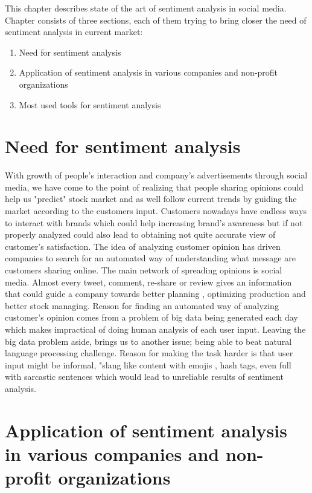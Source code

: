 This chapter describes state of the art of sentiment analysis in social media.
Chapter consists of three sections, each of them trying to bring closer the need of sentiment analysis in current market:

\begin{enumerate}
	\item Need for sentiment analysis
	\item Application of sentiment analysis in various companies and non-profit organizations
	\item Most used tools for sentiment analysis
\end{enumerate}

\section{Need for sentiment analysis}
With growth of people's interaction and company's advertisements through social media, we have come to the point of realizing that people sharing opinions could help us "predict" stock market and as well follow current trends by guiding the market according to the customers input.
Customers nowadays have endless ways to interact with brands which could help increasing brand's awareness but if not properly analyzed could also lead to obtaining not quite accurate view of customer's satisfaction.
The idea of analyzing customer opinion has driven companies to search for an automated way of understanding what message are customers sharing online. The main network of spreading opinions is social media. Almost every tweet, comment, re-share or  review gives an information that could guide a company towards better planning , optimizing production and better stock managing.
Reason for finding an automated way of analyzing customer's opinion comes from a problem of big data being generated each day which makes impractical of doing human analysis of each user input. Leaving the big data problem aside, brings us to another issue; being able to beat natural language processing challenge. Reason for making the task harder is that user input might be informal, "slang like content with emojis , hash tags, even full with sarcastic sentences which would lead to unreliable results of sentiment analysis.

\section{Application of sentiment analysis in various companies and non-profit organizations}

